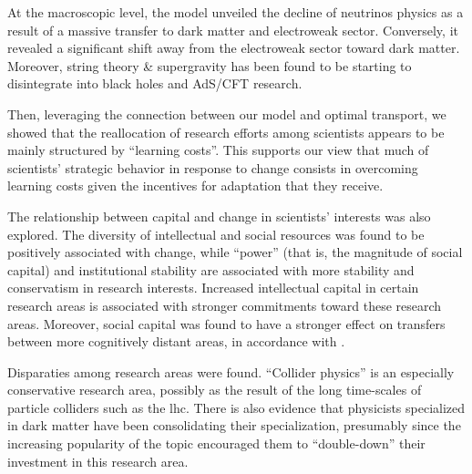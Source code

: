 \documentclass{article}
\begin{document}




At the macroscopic level, the model unveiled the decline of neutrinos physics as a result of a massive transfer to dark matter and electroweak sector. Conversely, it revealed a significant shift away from the electroweak sector toward dark matter. Moreover, string theory \& supergravity has been found to be starting to disintegrate into black holes and AdS/CFT research.

Then, leveraging the connection between our model and optimal transport, we showed that the reallocation of research efforts among scientists appears to be mainly structured by ``learning costs''. This supports our view that much of scientists' strategic behavior in response to change consists in overcoming learning costs given the incentives for adaptation that they receive.

The relationship between capital and change in scientists' interests was also explored. The diversity of intellectual and social resources was found to be positively associated with change, while ``power'' (that is, the magnitude of social capital) and institutional stability are associated with more stability and conservatism in research interests. Increased intellectual capital in certain research areas is associated with stronger commitments toward these research areas. Moreover, social capital was found to have a stronger effect on transfers between more cognitively distant areas, in accordance with \citealt{Tripodi2020}.

Disparaties among research areas were found. ``Collider physics'' is an especially conservative research area, possibly as the result of the long time-scales of particle colliders such as the \gls{lhc}. There is also evidence that physicists specialized in dark matter have been consolidating their specialization, presumably since the increasing popularity of the topic encouraged them to ``double-down'' their investment in this research area.
\end{document}
